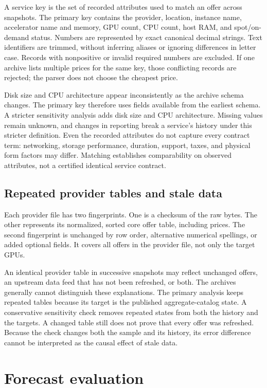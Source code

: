 \documentclass[10pt]{article}
\begin{document}
A service key is the set of recorded attributes used to match an offer across snapshots. The primary key contains the provider, location, instance name, accelerator name and memory, GPU count, CPU count, host RAM, and spot/on-demand status. Numbers are represented by exact canonical decimal strings. Text identifiers are trimmed, without inferring aliases or ignoring differences in letter case. Records with nonpositive or invalid required numbers are excluded. If one archive lists multiple prices for the same key, those conflicting records are rejected; the parser does not choose the cheapest price.

Disk size and CPU architecture appear inconsistently as the archive schema changes. The primary key therefore uses fields available from the earliest schema. A stricter sensitivity analysis adds disk size and CPU architecture. Missing values remain unknown, and changes in reporting break a service's history under this stricter definition. Even the recorded attributes do not capture every contract term: networking, storage performance, duration, support, taxes, and physical form factors may differ. Matching establishes comparability on observed attributes, not a certified identical service contract.

\subsection{Repeated provider tables and stale data}

Each provider file has two fingerprints. One is a checksum of the raw bytes. The other represents its normalized, sorted core offer table, including prices. The second fingerprint is unchanged by row order, alternative numerical spellings, or added optional fields. It covers all offers in the provider file, not only the target GPUs.

An identical provider table in successive snapshots may reflect unchanged offers, an upstream data feed that has not been refreshed, or both. The archives generally cannot distinguish these explanations. The primary analysis keeps repeated tables because its target is the published aggregate-catalog state. A conservative sensitivity check removes repeated states from both the history and the targets. A changed table still does not prove that every offer was refreshed. Because the check changes both the sample and its history, its error difference cannot be interpreted as the causal effect of stale data.

\section{Forecast evaluation}
\end{document}
